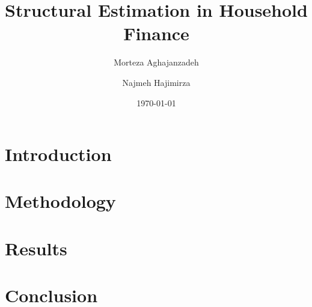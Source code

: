 \documentclass{article}
\title{Structural Estimation in Household Finance}
\author{Morteza Aghajanzadeh \and Najmeh Hajimirza}
\date{\today}
\begin{document}
\maketitle

\section{Introduction}
\lipsum[1]

\section{Methodology}
\lipsum[2]

\section{Results}
\lipsum[3]

\section{Conclusion}
\lipsum[4]
\end{document}
